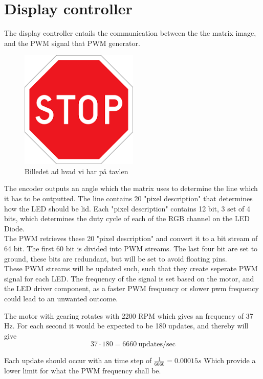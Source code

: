 \section{Display controller}
The display controller entails the communication between the the matrix image, and the PWM signal that PWM generator. 


\begin{figure}[H]
	\center
	\includegraphics[width = 0.5\textwidth]{images/stop}
	\caption{Billedet ad hvad vi har på tavlen}
	\label{fig:Image_controller_setup}
\end{figure}

The encoder outputs an angle which the matrix uses to determine the line which it has to be outputted.  The line contains 20 "pixel description" that determines how the LED should be lid.  Each "pixel description" contains 12 bit, 3 set of 4 bits, which determines the duty cycle of each of the RGB channel on the LED Diode.  \\

The PWM retrieves these 20 "pixel description" and convert it to a bit stream of 64 bit.  
The first 60 bit is divided into PWM streams. The last four bit are set to ground,  these bits are redundant, but will be set to avoid floating pins. \\

These PWM streams will be updated such, such that they create seperate PWM signal for each LED.  The frequency of the signal is set based on the motor, and the LED driver component, as a faster PWM frequency or slower pwm frequency could lead to an unwanted outcome. 

The motor with gearing rotates with 2200 RPM which gives an frequency of 37 Hz.	
For each second it would be expected to be 180 updates, and thereby will give 
$$37 \cdot 180 = 6660 ~\text{updates/sec}$$

Each update should occur with an time step of $\frac{1}{6660} = 0.00015s$ Which provide a lower limit for what the PWM frequency shall be.  \\

